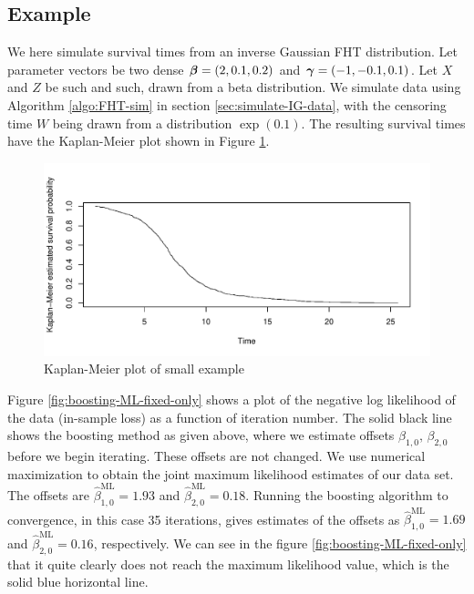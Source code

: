 \subsection{Example}
We here simulate survival times from an inverse Gaussian FHT distribution.
Let parameter vectors be two dense $\boldsymbol{\beta}=(2,0.1,0.2)$ and $\boldsymbol{\gamma}=(-1, -0.1, 0.1)$.
Let $X$ and $Z$ be such and such, drawn from a beta distribution.
We simulate data using Algorithm \ref{algo:FHT-sim} in section \ref{sec:simulate-IG-data}, with the censoring time $W$ being drawn from a distribution $\exp(0.1)$.
The resulting survival times have the Kaplan-Meier plot shown in Figure \ref{fig:small-example-kaplan-meier}.
\begin{figure}\label{fig:small-example-kaplan-meier}
\caption{Kaplan-Meier plot of small example}
\centering\includegraphics[scale=0.4]{figures/case1.pdf}
\end{figure}
Figure \ref{fig:boosting-ML-fixed-only} shows a plot of the negative log likelihood of the data (in-sample loss) as a function of iteration number.
The solid black line shows the boosting method as given above, where we estimate offsets $\beta_{1,0},\,\beta_{2,0}$ before we begin iterating.
These offsets are not changed.
We use numerical maximization to obtain the joint maximum likelihood estimates of our data set.
The offsets are $\hat{\beta}^{\text{ML}}_{1,0}=1.93$ and $\hat{\beta}^{\text{ML}}_{2,0}=0.18$.
Running the boosting algorithm to convergence, in this case 35 iterations, gives estimates of the offsets as $\hat{\beta}^{\text{ML}}_{1,0}=1.69$ and $\hat{\beta}^{\text{ML}}_{2,0}=0.16$, respectively.
We can see in the figure \ref{fig:boosting-ML-fixed-only} that it quite clearly does not reach the maximum likelihood value, which is the solid blue horizontal line.

